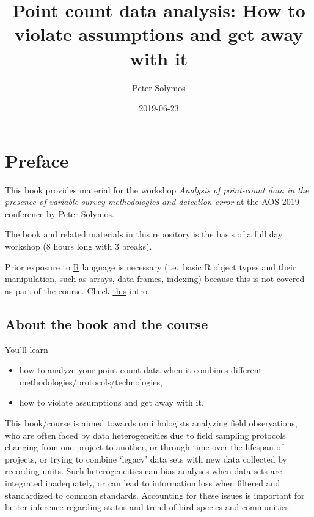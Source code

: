 \documentclass[12pt,]{book}
\title{Point count data analysis: How to violate assumptions and get away with it}
\author{Peter Solymos}
\date{2019-06-23}
\providecommand{\tightlist}{%
  \setlength{\itemsep}{0pt}\setlength{\parskip}{0pt}}
\begin{document}
\maketitle

{
\hypersetup{linkcolor=black}
\setcounter{tocdepth}{2}
\tableofcontents
}
\listoftables
\listoffigures
\hypertarget{foreword}{%
\chapter*{Preface}\label{foreword}}

This book provides material for the workshop
\emph{Analysis of point-count data in the presence of variable survey methodologies and detection error}
at the \href{https://amornithmeeting.org/}{AOS 2019 conference}
by \href{http://peter.solymos.org}{Peter Solymos}.

The book and related materials in this repository is the basis of a
full day workshop (8 hours long with 3 breaks).

Prior exposure to \href{https://www.r-project.org/}{R} language is necessary
(i.e.~basic R object types and their manipulation, such as arrays, data frames, indexing)
because this is not covered as part of the course.
Check \href{_etc/R-basics.pdf}{this} intro.

\hypertarget{about-the-book-and-the-course}{%
\section*{About the book and the course}\label{about-the-book-and-the-course}}

You'll learn

\begin{itemize}
\tightlist
\item
  how to analyze your point count data when it combines different methodologies/protocols/technologies,
\item
  how to violate assumptions and get away with it.
\end{itemize}

This book/course is aimed towards ornithologists analyzing field observations,
who are often faced by data heterogeneities due to
field sampling protocols changing from one project to another,
or through time over the lifespan of projects, or trying to combine
`legacy' data sets with new data collected by recording units.
Such heterogeneities can bias analyses when data sets are integrated
inadequately, or can lead to information loss when filtered and standardized to
common standards. Accounting for these issues is important for better
inference regarding status and trend of bird species and communities.
\end{document}
